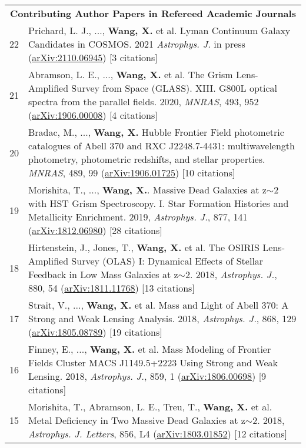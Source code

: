 \documentclass[letterpaper,10pt]{article}
\newcommand{\narrow}{-1.8ex}
\begin{document}
\begin{longtable}{rp{6.3in}}
\\[\narrow]
\multicolumn{2}{c}{\textbf{Contributing Author Papers in Refereed Academic Journals}}      \\

22  &   Prichard, L. J., ..., \textbf{Wang, X.} et al. Lyman Continuum Galaxy Candidates in COSMOS. 2021 \textit{Astrophys. J.} in 
    press (\href{https://arxiv.org/abs/2110.06945}{arXiv:2110.06945}) [3 citations]  \\
21  &   Abramson, L. E., ..., \textbf{Wang, X.} et al. The Grism Lens-Amplified Survey from Space (GLASS). XIII. G800L optical spectra from the 
    parallel fields. 2020, \textit{MNRAS}, 493, 952 (\href{https://arxiv.org/abs/1906.00008}{arXiv:1906.00008}) [4 citations]  \\
20  &   Bradac, M., ..., \textbf{Wang, X.} Hubble Frontier Field photometric catalogues of Abell 370 and RXC J2248.7-4431: 
    multiwavelength photometry, photometric redshifts, and stellar properties. \textit{MNRAS}, 489, 99 
    (\href{https://arxiv.org/abs/1906.01725}{arXiv:1906.01725}) [10 citations]  \\
19  &   Morishita, T., ..., \textbf{Wang, X.}. Massive Dead Galaxies at z$\sim$2 with HST Grism Spectroscopy. I. Star Formation Histories and 
    Metallicity Enrichment. 2019, \textit{Astrophys. J.}, 877, 141 (\href{https://arxiv.org/abs/1812.06980}{arXiv:1812.06980}) [28 citations] \\
18  &   Hirtenstein, J., Jones, T., \textbf{Wang, X.} et al. The OSIRIS Lens-Amplified Survey (OLAS) I: Dynamical Effects of Stellar Feedback in Low 
    Mass Galaxies at z$\sim$2. 2018, \textit{Astrophys. J.}, 880, 54 (\href{https://arxiv.org/abs/1811.11768}{arXiv:1811.11768}) 
    [13 citations] \\
17  &   Strait, V., ..., \textbf{Wang, X.} et al. Mass and Light of Abell 370: A Strong and Weak Lensing Analysis. 2018, \textit{Astrophys. J.}, 868, 
    129 (\href{https://arxiv.org/abs/1805.08789}{arXiv:1805.08789}) [19 citations] \\
16  &   Finney, E., ..., \textbf{Wang, X.} et al. Mass Modeling of Frontier Fields Cluster MACS J1149.5+2223 Using Strong and Weak Lensing. 2018, 
    \textit{Astrophys. J.}, 859, 1 (\href{https://arxiv.org/abs/1806.00698}{arXiv:1806.00698}) [9 citations] \\
15  &   Morishita, T., Abramson, L. E., Treu, T., \textbf{Wang, X.} et al.  Metal Deficiency in Two Massive Dead Galaxies at z$\sim$2. 2018, 
    \textit{Astrophys. J. Letters}, 856, L4 (\href{https://arxiv.org/abs/1803.01852}{arXiv:1803.01852}) [12 citations]  \\

\end{longtable}
\end{document}
